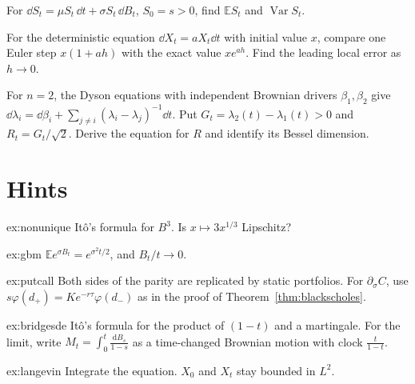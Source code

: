 \begin{exercise}[$\star$]\label{ex:v12gbmvariance}
For $\dd S_t=\mu S_t\,\dd t+\sigma S_t\,\dd B_t$, $S_0=s>0$, find $\mathbb ES_t$ and $\operatorname{Var}S_t$.
\end{exercise}

\begin{exercise}[$\star\star$]\label{ex:v12eulerlocal}
For the deterministic equation $\dd X_t=aX_t\dd t$ with initial value $x$, compare one Euler step $x(1+ah)$ with the exact value $xe^{ah}$. Find the leading local error as $h\to0$.
\end{exercise}

\begin{exercise}[$\star\star\star$]\label{ex:v12dysonbessel}
For $n=2$, the Dyson equations with independent Brownian drivers $\beta_1,\beta_2$ give $\dd\lambda_i=\dd\beta_i+\sum_{j\ne i}(\lambda_i-\lambda_j)^{-1}\dd t$. Put $G_t=\lambda_2(t)-\lambda_1(t)>0$ and $R_t=G_t/\sqrt2$. Derive the equation for $R$ and identify its Bessel dimension.
\end{exercise}

\section{Hints}

\begin{hint}{ex:nonunique}
It\^o's formula for $B^3$. Is $x\mapsto3x^{1/3}$ Lipschitz?
\end{hint}

\begin{hint}{ex:gbm}
$\mathbb Ee^{\sigma B_t}=e^{\sigma^2t/2}$, and $B_t/t\to0$.
\end{hint}

\begin{hint}{ex:putcall}
Both sides of the parity are replicated by static portfolios. For $\partial_\sigma C$, use $s\varphi(d_+)=Ke^{-r\tau}\varphi(d_-)$ as in the proof of Theorem~\ref{thm:blackscholes}.
\end{hint}

\begin{hint}{ex:bridgesde}
It\^o's formula for the product of $(1-t)$ and a martingale. For the limit, write $M_t=\int_0^t\frac{\mathrm dB_s}{1-s}$ as a time-changed Brownian motion with clock $\frac t{1-t}$.
\end{hint}

\begin{hint}{ex:langevin}
Integrate the equation. $X_0$ and $X_t$ stay bounded in $L^2$.
\end{hint}

